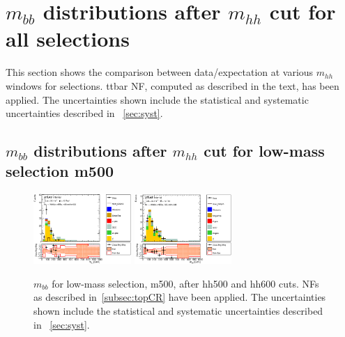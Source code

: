 \section{$m_{bb}$ distributions after $m_{hh}$ cut for all selections}
This section shows the comparison between data/expectation at various $m_{hh}$ windows for selections. ttbar NF, computed as described in the text, has been applied. The uncertainties shown include the statistical and systematic uncertainties described in ~\ref{sec:syst}.

\subsection{$m_{bb}$ distributions after $m_{hh}$ cut for low-mass selection m500} 
\begin{figure}[!h]
\begin{center}
\includegraphics*[width=0.33\textwidth] {figures/ControlPlots/reOpt500_bbMass_allMhh/C_reOpt500_mww_bbpt210_wwpt150_hh500_bbMass_regionA_met25d020}
\includegraphics*[width=0.33\textwidth] {figures/ControlPlots/reOpt500_bbMass_allMhh/C_reOpt500_mww_bbpt210_wwpt150_hh600_bbMass_regionA_met25d020}

\caption[$m_{bb}$ for low-mass selection, m500, after hh500 and hh600 cuts.]{$m_{bb}$ for low-mass selection, m500, after hh500 and hh600 cuts. \ttbar NFs as described in~\ref{subsec:topCR} have been applied. The uncertainties shown include the statistical and systematic uncertainties described in ~\ref{sec:syst}.}


\end{center}
\end{figure}

